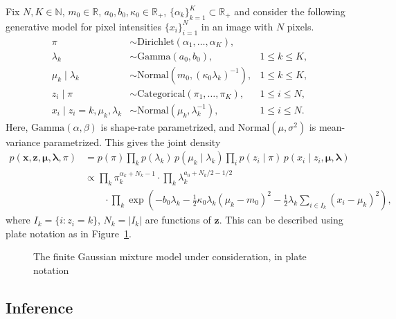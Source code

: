\documentclass[12pt]{article}
\newcommand{\N}{\mathbb{N}}
\newcommand{\R}{\mathbb{R}}
\begin{document}
Fix $N, K \in \N$, $m_0 \in \R$, $a_0, b_0, \kappa_0 \in \R_+$,
$\{\alpha_k\}_{k = 1}^K \subset \R_+$ and consider the following generative
model for pixel intensities $\{x_i\}_{i = 1}^N$ in an image with $N$ pixels.
\begin{align*}
    \pi &\sim \text{Dirichlet}(\alpha_1, \dots, \alpha_K), \\
    \lambda_k &\sim \text{Gamma}(a_0, b_0), & 1 \leq k \leq K, \\
    \mu_k \mid \lambda_k &\sim \text{Normal}(m_0, (\kappa_0\lambda_k)^{-1}), & 1 \leq k \leq K, \\
    z_i \mid \pi &\sim \text{Categorical}(\pi_1, \dots, \pi_K), & 1 \leq i \leq N, \\
    x_i \mid z_i = k, \mu_k, \lambda_k &\sim \text{Normal}(\mu_k, \lambda_k^{-1}), & 1 \leq i \leq N.
\end{align*}
Here, $\text{Gamma}(\alpha, \beta)$ is shape-rate parametrized, and
$\text{Normal}(\mu, \sigma^2)$ is mean-variance parametrized.
This gives the joint density \begin{align*}
    p(\bm{x}, \bm{z}, \bm{\mu}, \bm{\lambda}, \pi)
        &= p(\pi) \prod_k p(\lambda_k)\, p(\mu_k\mid \lambda_k)\prod_i p(z_i \mid \pi)\, p(x_i \mid z_i, \bm{\mu}, \bm{\lambda}) \\
        &\propto \prod_k \pi_k^{\alpha_k + N_k - 1} \cdot \prod_k \lambda_k^{a_0 + N_k / 2 - 1 /2} \\
            &\qquad \cdot \prod_k \exp\left(-b_0\lambda_k -\frac{1}{2}\kappa_0\lambda_k(\mu_k - m_0)^2 -\frac{1}{2}\lambda_k\sum_{i \in I_k}(x_i - \mu_k)^2\right),
\end{align*}
where $I_k = \{i : z_i = k\}$, $N_k = |I_k|$ are functions of $\bm{z}$.
This can be described using plate notation as in Figure~\ref{fig:iotd_gmm}.

\begin{figure}[ht!]
\caption{The finite Gaussian mixture model under consideration, in plate notation}
\label{fig:iotd_gmm}
\end{figure}


\subsection*{Inference}
\end{document}
